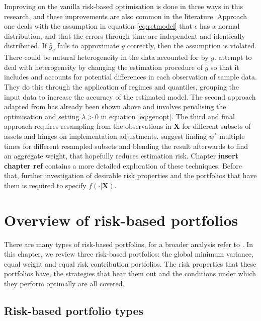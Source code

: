 \documentclass[
]{article}
\begin{document}
Improving on the vanilla risk-based optimisation is done in three ways in this research, and these
improvements are also common in the literature. Approach one deals with the assumption in equation
\eqref{eq:retmodel} that \(\epsilon\) has a normal distribution, and that the errors through time are
independent and identically distributed. If \(\hat{g}_q\) fails to approximate \(g\) correctly, then the
assumption is violated. There could be natural heterogeneity in the data accounted for by \(g\). \citet{FD18}
attempt to deal with heterogeneity by changing the estimation procedure of \({g}\) so that it includes
and accounts for potential differences in each observation of sample data. They do this through the
application of regimes and quantiles, grouping the input data to increase the accuracy of the
estimated model. The second approach adapted from \citet{K18} has already been shown above and
involves penalising the optimisation and setting \(\lambda > 0\) in equation \eqref{eq:genopt}. The
third and final approach requires resampling from the observations in \(\textbf{X}\) for different
subsets of assets and hinges on implementation adjustments. \citet{SW17} suggest finding \(w^*\)
multiple times for different resampled subsets and blending the result afterwards to find an
aggregate weight, that hopefully reduces estimation risk. Chapter \textbf{insert chapter ref} contains a
more detailed exploration of these techniques. Before that, further investigation of desirable risk
properties and the portfolios that have them is required to specify \(f(\cdot|\textbf{X})\).

\hypertarget{overview-of-risk-based-portfolios}{%
\section{Overview of risk-based portfolios}\label{overview-of-risk-based-portfolios}}

There are many types of risk-based portfolios, for a broader analysis refer to \citet{DV17}. In this chapter,
we review three risk-based portfolios: the global minimum variance, equal weight and equal risk
contribution portfolios. The risk properties that these portfolios have, the strategies that bear them
out and the conditions under which they perform optimally are all covered.

\hypertarget{risk-based-portfolio-types}{%
\subsection{Risk-based portfolio types}\label{risk-based-portfolio-types}}
\end{document}
